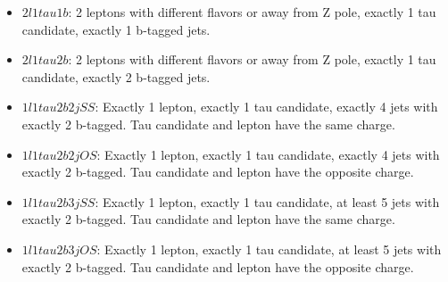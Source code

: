 \begin{itemize}
\item{$2l1tau1b$: 2 leptons with different flavors or away from Z pole, exactly 1 tau candidate,  exactly 1 b-tagged jets.}
\item{$2l1tau2b$: 2 leptons with different flavors or away from Z pole, exactly 1 tau candidate,  exactly 2 b-tagged jets.}
\item{$1l1tau2b2j SS$: Exactly 1 lepton, exactly 1 tau candidate, exactly 4 jets with exactly 2 b-tagged. Tau candidate and lepton have the same charge.}
\item{$1l1tau2b2j OS$: Exactly 1 lepton, exactly 1 tau candidate, exactly 4 jets with exactly 2 b-tagged. Tau candidate and lepton have the opposite charge.}
\item{$1l1tau2b3j SS$: Exactly 1 lepton, exactly 1 tau candidate, at least 5 jets with exactly 2 b-tagged. Tau candidate and lepton have the same charge.}
\item{$1l1tau2b3j OS$: Exactly 1 lepton, exactly 1 tau candidate, at least 5 jets with exactly 2 b-tagged. Tau candidate and lepton have the opposite charge.}
\end{itemize}

